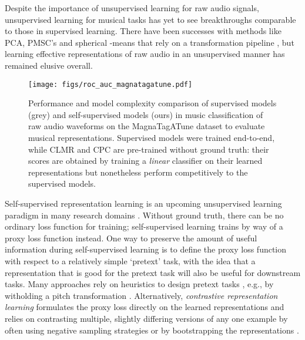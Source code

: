 \documentclass{article}
\begin{document}
Despite the importance of unsupervised learning for raw audio signals, unsupervised learning for musical tasks has yet to see breakthroughs comparable to those in supervised learning.
There have been successes with methods like PCA, PMSC's and spherical -means that rely on a transformation pipeline \cite{hamel2011temporal, dieleman_feature_learning}, but learning effective representations of raw audio in an unsupervised manner has remained elusive overall.

\begin{figure}[t]
    \texttt{[image: figs/roc\_auc\_magnatagatune.pdf]}
    \caption{Performance and model complexity comparison of supervised models (grey) and self-supervised models (ours) in music classification of raw audio waveforms on the Magna\-Tag\-A\-Tune dataset to evaluate musical representations.
Supervised models were trained end-to-end, while CLMR and CPC are pre-trained without ground truth: their scores are obtained by training a \textit{linear} classifier on their learned representations but nonetheless perform competitively to the supervised models.}
    \label{fig:music_tagging_overview}
\end{figure}


Self-supervised representation learning is an upcoming unsupervised learning paradigm in many research domains \cite{dosovitskiy2015discriminative, oord_representation_2019, hjelm_learning_2019,chen_simple_2020,grill2020bootstrap}.
Without ground truth, there can be no ordinary loss function for training; self-supervised learning trains by way of a proxy loss function instead.
One way to preserve the amount of useful information during self-supervised learning is to define the proxy loss function with respect to a relatively simple `pretext' task, with the idea that a representation that is good for the pretext task will also be useful for downstream tasks.
Many approaches rely on heuristics to design pretext tasks \cite{doersch_unsupervised_2015,zhang2016colorful}, e.g., by witholding a pitch transformation \cite{spice}.
Alternatively, \emph{contrastive representation learning} formulates the proxy loss directly on the learned representations and relies on contrasting multiple, slightly differing versions of any one example by often using negative sampling strategies \cite{tian2019contrastive,he2019moco,chen_simple_2020} or by bootstrapping the representations \cite{grill2020bootstrap}.
\end{document}
